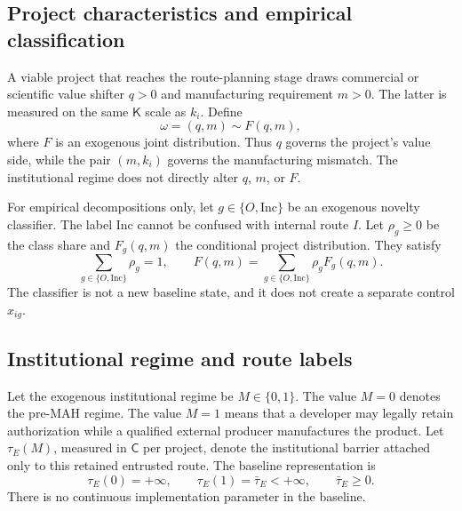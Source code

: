\subsection{Project characteristics and empirical classification}
\label{subsec:p01-projects}

A viable project that reaches the route-planning stage draws commercial or
scientific value shifter \(q>0\) and manufacturing requirement \(m>0\).  The
latter is measured on the same \(\mathsf K\) scale as \(k_i\).  Define
\begin{equation}
  \omega=(q,m)\sim F(q,m),
  \label{eq:p01-project-draw}
\end{equation}
where \(F\) is an exogenous joint distribution.  Thus \(q\) governs the
project's value side, while the pair \((m,k_i)\) governs the manufacturing
mismatch.  The institutional regime does not directly alter \(q\), \(m\), or
\(F\).

For empirical decompositions only, let
\(g\in\{O,\mathrm{Inc}\}\) be an exogenous novelty classifier.  The label
\(\mathrm{Inc}\) cannot be confused with internal route \(I\).  Let
\(\rho_g\geq0\) be the class share and \(F_g(q,m)\) the conditional project
distribution.  They satisfy
\begin{equation}
  \sum_{g\in\{O,\mathrm{Inc}\}}\rho_g=1,
  \qquad
  F(q,m)=
  \sum_{g\in\{O,\mathrm{Inc}\}}\rho_gF_g(q,m).
  \label{eq:p01-class-mixture}
\end{equation}
The classifier is not a new baseline state, and it does not create a separate
control \(x_{ig}\).

\subsection{Institutional regime and route labels}
\label{subsec:p01-institution-routes}

Let the exogenous institutional regime be \(M\in\{0,1\}\).  The value \(M=0\)
denotes the pre-MAH regime.  The value \(M=1\) means that a developer may
legally retain authorization while a qualified external producer manufactures
the product.  Let \(\tau_E(M)\), measured in \(\mathsf C\) per project, denote
the institutional barrier attached only to this retained entrusted route.  The
baseline representation is
\begin{equation}
  \tau_E(0)=+\infty,
  \qquad
  \tau_E(1)=\bar\tau_E<+\infty,
  \qquad
  \bar\tau_E\geq0.
  \label{eq:p01-institutional-wedge}
\end{equation}
There is no continuous implementation parameter in the baseline.

